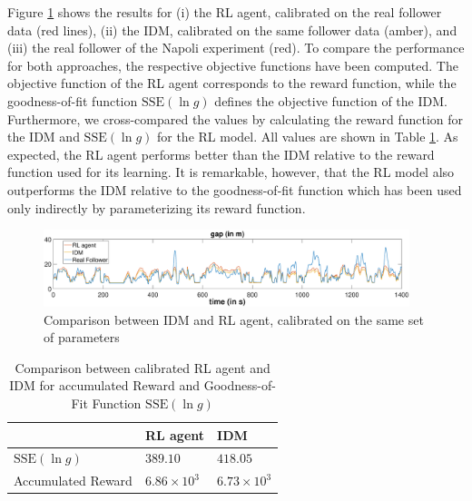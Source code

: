\documentclass[review]{elsarticle}
\providecommand{\martin}[1]{#1}                  %
\providecommand{\3}{{\ss}}
\begin{document}
Figure \ref{fig:IDMvsRL} shows the results for \martin{(i)} the RL
agent, calibrated on the real follower data (red lines), (ii) the IDM,
calibrated on the same follower data (amber), and (iii) the real
follower of the Napoli experiment (red). To \martin{compare} the
performance for both approaches, the respective objective functions
have been computed. The objective function of the RL agent corresponds
to the reward function, while the goodness-of-fit function
\martin{$\mathrm{SSE}(\ln g)$} defines the objective function of the
IDM. \martin{Furthermore, we cross-compared the values by calculating the
reward function for the IDM and $\mathrm{SSE}(\ln g)$ for the RL model. All
values are shown in Table \ref{tab:objectiveFunc}. 
As expected, the RL agent performs better than the IDM relative to the
  reward function used for its learning. It is remarkable, however, 
 that the RL model also outperforms the IDM relative to the
 goodness-of-fit function which has been used only indirectly by
 parameterizing its reward function.}

\begin{figure}
	
	\centering
	\includegraphics[width=0.95\textwidth]{images/IDMvsRL_dist}
	\caption{Comparison between IDM and RL agent, calibrated on the same set of parameters}
	\label{fig:IDMvsRL}
\end{figure}

\begin{table}
	\caption{Comparison between calibrated RL agent and IDM for
          accumulated Reward and Goodness-of-Fit Function $\mathrm{SSE}(\ln g)$} 
	\label{tab:objectiveFunc} 
	\begin{center}
		\begin{tabular}{p{} | p{} p{}  } 
			& RL agent & IDM   \\ \hline
			$\mathrm{SSE}(\ln g)$ & $389.10$ &  $418.05$	\\
			Accumulated Reward &  $6.86 \times 10^3$   & $6.73\times 10^3$
			
		\end{tabular}
	\end{center}
\end{table}
\end{document}
